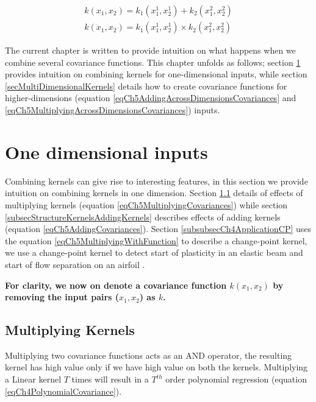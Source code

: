 \begin{align}
k(x_{1}, x_{2}) = k_{1}(x_{1}^{1}, x_{2}^{1}) + k_{2}(x_{1}^{2}, x_{2}^{2}) \label{eqCh5AddingAcrossDimensionsCovariances} \\
k(x_{1}, x_{2}) = k_{1}(x_{1}^{1}, x_{2}^{1}) \times k_{2}(x_{1}^{2}, x_{2}^{2}) \label{eqCh5MultiplyingAcrossDimensionsCovariances} 
\end{align}

The current chapter is written to provide intuition on what happens when we combine several covariance functions. This chapter unfolds as follows; section \ref{secSingleDimension} provides intuition on combining kernels for one-dimensional inputs, while section \ref{secMultiDimensionalKernels} details how to create covariance functions for higher-dimensions (equation \ref{eqCh5AddingAcrossDimensionsCovariances} and \ref{eqCh5MultiplyingAcrossDimensionsCovariances}) inputs. 

\section{One dimensional inputs}\label{secSingleDimension}
Combining kernels can give rise to interesting features, in this section we provide intuition on combining kernels in one dimension. Section \ref{subsecStructureKernelsMultiplyingKernels} details of effects of multiplying kernels (equation \ref{eqCh5MultiplyingCovariances}) while section \ref{subsecStructureKernelsAddingKernels} describes effects of adding kernels (equation \ref{eqCh5AddingCovariances}). Section \ref{subsubsecCh4ApplicationCP} uses the equation \ref{eqCh5MultiplyingWithFunction} to describe a change-point kernel, we use a change-point kernel to detect start of plasticity in an elastic beam and start of flow separation on an airfoil \cite{chiplunkar:hal-01555401}. 

\textbf{For clarity, we now on denote a covariance function $k(x_{1}, x_{2})$ by removing the input pairs ($x_{1}, x_{2}$) as $k$.}
 

\subsection{Multiplying Kernels} \label{subsecStructureKernelsMultiplyingKernels}
Multiplying two covariance functions acts as an AND operator, the resulting kernel has high value only if we have high value on both the kernels. Multiplying a Linear kernel $T$ times will result in a $T^{th}$ order polynomial regression (equation \ref{eqCh4PolynomialCovariance}). 


